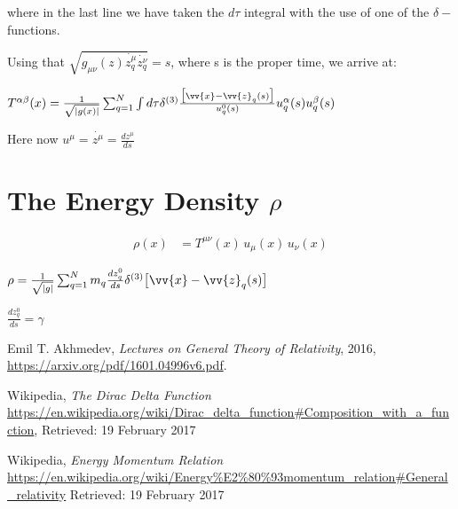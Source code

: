 \documentclass[]{article}
\begin{document}
where in the last line we have taken the $d\tau$ integral with the use of one of the $\delta-$ functions.

Using that $\sqrt{g_{\mu\nu}(z)\dot{z_q^\mu}\dot{z_q^\nu}}=s$, where s is the proper time, we arrive at:

$T^{\alpha\beta}(x) = \frac{1}{\sqrt{|g(x)|}} \sum_{q=1}^{N} \int d\tau \delta^{(3)} \frac{\big[\vv{x}-\vv{z}_q(s)\big]}{u_q^0 (s)} u_q^\alpha (s) u_q^\beta (s)$

Here now $u^{\mu} = \dot{z^\mu} = \frac{d z^\mu}{d s}$


\section{The Energy Density $\rho$}

\begin{align}
\rho(x) &= T^{\mu\nu}(x) \, u_\mu(x) \, u_\nu(x)
\end{align}


$\rho = \frac{1}{\sqrt{|g|}} \sum_{q=1}^{N} m_q \frac{d z^0_q}{d s} \delta^{(3)} \big[\vv{x}-\vv{z}_q(s)\big]$ 

$\frac{d z^0_q}{d s}=\gamma$

\begin{thebibliography}{9}
	
	Emil T. Akhmedev,
	\emph{Lectures on General Theory of Relativity},
	2016,
	\url{https://arxiv.org/pdf/1601.04996v6.pdf}.
	
	Wikipedia,
	\emph{The Dirac Delta Function}
	\url{https://en.wikipedia.org/wiki/Dirac_delta_function#Composition_with_a_function},
	Retrieved: 19 February 2017
	
	Wikipedia,
	\emph{Energy Momentum Relation}
	\url{https://en.wikipedia.org/wiki/Energy%E2%80%93momentum_relation#General_relativity}
		Retrieved: 19 February 2017
\end{thebibliography}
\end{document}
